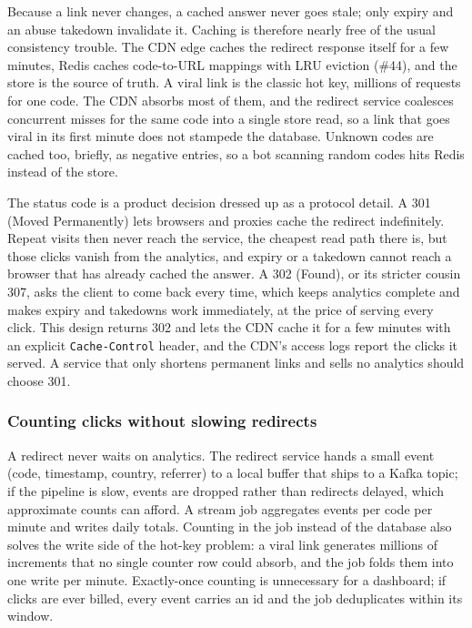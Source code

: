 \documentclass[
  letterpaper,
  oneside,
  11pt,
  openany]{scrbook}
\begin{document}
Because a link never changes, a cached answer never goes stale; only
expiry and an abuse takedown invalidate it. Caching is therefore nearly
free of the usual consistency trouble. The CDN edge caches the redirect
response itself for a few minutes, Redis caches code-to-URL mappings
with LRU eviction (\#44), and the store is the source of truth. A viral
link is the classic hot key, millions of requests for one code. The CDN
absorbs most of them, and the redirect service coalesces concurrent
misses for the same code into a single store read, so a link that goes
viral in its first minute does not stampede the database. Unknown codes
are cached too, briefly, as negative entries, so a bot scanning random
codes hits Redis instead of the store.

The status code is a product decision dressed up as a protocol detail. A
301 (Moved Permanently) lets browsers and proxies cache the redirect
indefinitely. Repeat visits then never reach the service, the cheapest
read path there is, but those clicks vanish from the analytics, and
expiry or a takedown cannot reach a browser that has already cached the
answer. A 302 (Found), or its stricter cousin 307, asks the client to
come back every time, which keeps analytics complete and makes expiry
and takedowns work immediately, at the price of serving every click.
This design returns 302 and lets the CDN cache it for a few minutes with
an explicit \texttt{Cache-Control} header, and the CDN's access logs
report the clicks it served. A service that only shortens permanent
links and sells no analytics should choose 301.

\subsubsection{Counting clicks without slowing
redirects}\label{counting-clicks-without-slowing-redirects}

A redirect never waits on analytics. The redirect service hands a small
event (code, timestamp, country, referrer) to a local buffer that ships
to a Kafka topic; if the pipeline is slow, events are dropped rather
than redirects delayed, which approximate counts can afford. A stream
job aggregates events per code per minute and writes daily totals.
Counting in the job instead of the database also solves the write side
of the hot-key problem: a viral link generates millions of increments
that no single counter row could absorb, and the job folds them into one
write per minute. Exactly-once counting is unnecessary for a dashboard;
if clicks are ever billed, every event carries an id and the job
deduplicates within its window.
\end{document}
